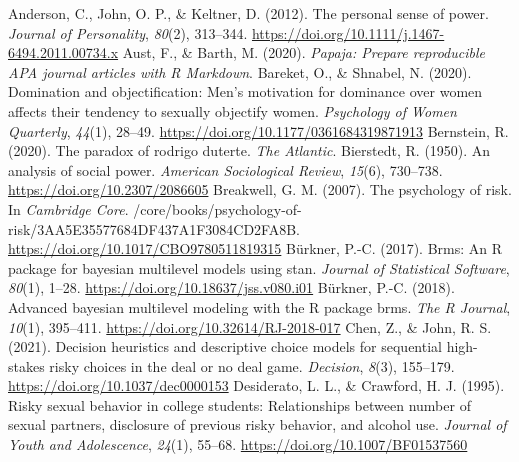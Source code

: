 \documentclass[
  donotrepeattitle,doc, 12pt, a4paper,floatsintext]{apa7}
\newlength{\cslhangindent}
\newlength{\cslentryspacingunit} %
\newenvironment{CSLReferences}[2] %
 {%
  \setlength{\parindent}{0pt}
  \ifodd #1
  \let\oldpar\par
  \def\par{\hangindent=\cslhangindent\oldpar}
  \fi
  \setlength{\parskip}{#2\cslentryspacingunit}
 }%
 {}
\begin{document}
\hypertarget{refs}{}
\begin{CSLReferences}{1}{0}
\leavevmode{}%
Anderson, C., John, O. P., \& Keltner, D. (2012). The personal sense of power. \emph{Journal of Personality}, \emph{80}(2), 313--344. \url{https://doi.org/10.1111/j.1467-6494.2011.00734.x}
\leavevmode{}%
Aust, F., \& Barth, M. (2020). \emph{Papaja: {Prepare} reproducible {APA} journal articles with {R Markdown}}.
\leavevmode{}%
Bareket, O., \& Shnabel, N. (2020). Domination and objectification: Men's motivation for dominance over women affects their tendency to sexually objectify women. \emph{Psychology of Women Quarterly}, \emph{44}(1), 28--49. \url{https://doi.org/10.1177/0361684319871913}
\leavevmode{}%
Bernstein, R. (2020). The paradox of rodrigo duterte. \emph{The Atlantic}.
\leavevmode{}%
Bierstedt, R. (1950). An analysis of social power. \emph{American Sociological Review}, \emph{15}(6), 730--738. \url{https://doi.org/10.2307/2086605}
\leavevmode{}%
Breakwell, G. M. (2007). The psychology of risk. In \emph{Cambridge Core}. /core/books/psychology-of-risk/3AA5E35577684DF437A1F3084CD2FA8B. \url{https://doi.org/10.1017/CBO9780511819315}
\leavevmode{}%
Bürkner, P.-C. (2017). Brms: An {R} package for bayesian multilevel models using stan. \emph{Journal of Statistical Software}, \emph{80}(1), 1--28. \url{https://doi.org/10.18637/jss.v080.i01}
\leavevmode{}%
Bürkner, P.-C. (2018). Advanced bayesian multilevel modeling with the {R} package brms. \emph{The R Journal}, \emph{10}(1), 395--411. \url{https://doi.org/10.32614/RJ-2018-017}
\leavevmode{}%
Chen, Z., \& John, R. S. (2021). Decision heuristics and descriptive choice models for sequential high-stakes risky choices in the deal or no deal game. \emph{Decision}, \emph{8}(3), 155--179. \url{https://doi.org/10.1037/dec0000153}
\leavevmode{}%
Desiderato, L. L., \& Crawford, H. J. (1995). Risky sexual behavior in college students: Relationships between number of sexual partners, disclosure of previous risky behavior, and alcohol use. \emph{Journal of Youth and Adolescence}, \emph{24}(1), 55--68. \url{https://doi.org/10.1007/BF01537560}
\leavevmode{}%

\end{CSLReferences}
\end{document}
